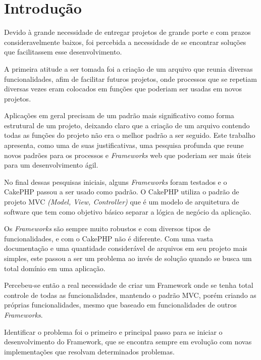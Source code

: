 \chapter{Introdução\label{cap:introducao}}
    Devido à grande necessidade de entregar projetos de grande porte e com prazos consideravelmente baixos, foi percebida a necessidade de se encontrar soluções que facilitassem esse desenvolvimento.

    A primeira atitude a ser tomada foi a criação de um arquivo que reunia diversas funcionalidades, afim de facilitar futuros projetos, onde processos que se repetiam diversas vezes eram colocados em funções que poderiam ser usadas em novos projetos.

    Aplicações em geral precisam de um padrão mais significativo como forma estrutural de um projeto, deixando claro que a criação de um arquivo contendo todas as funções do projeto não era o melhor padrão a ser seguido. Este trabalho apresenta, como uma de suas justificativas, uma pesquisa profunda que reune novos padrões para os processos e \emph{Frameworks} web que poderiam ser mais úteis para um desenvolvimento ágil.

    No final dessas pesquisas iniciais, alguns \emph{Frameworks} foram testados e o CakePHP passou a ser usado como padrão. O CakePHP utiliza o padrão de projeto MVC \emph{(Model, View, Controller)} que é um modelo de arquitetura de software que tem como objetivo básico separar a lógica de negócio da aplicação.

    Os \emph{Frameworks} são sempre muito robustos e com diversos tipos de funcionalidades, e com o CakePHP não é diferente. Com uma vasta documentação e uma quantidade considerável de arquivos em seu projeto mais simples, este passou a ser um problema ao invés de solução quando se busca um total domínio em uma aplicação.

    Percebeu-se então a real necessidade de criar um Framework onde se tenha total controle de todas as funcionalidades, mantendo o padrão MVC, porém criando as próprias funcionalidades, mesmo que baseado em funcionalidades de outros \emph{Frameworks}.

    Identificar o problema foi o primeiro e principal passo para se iniciar o desenvolvimento do Framework, que se encontra sempre em evolução com novas implementações que resolvam determinados problemas.
